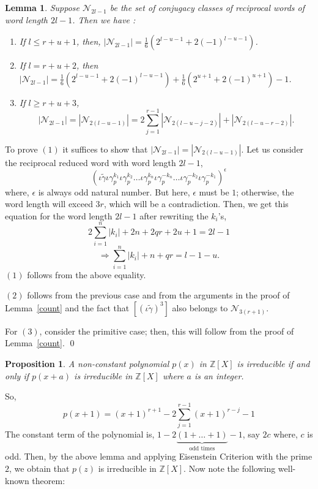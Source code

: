 \documentclass[11pt]{amsart}
\renewenvironment{proof}{{\bfseries Proof.}}{\qed}
\numberwithin{equation}{section}
\newtheorem{pro}[theorem]{Proposition}
\newtheorem{lemma}[theorem]{Lemma}
\theoremstyle{definition}
\newcommand{\gt}{\tilde{\gamma}}
\newcommand{\imp}{\Rightarrow}
\newcommand{\g}{\gamma_{p}}
\newcommand{\io}{\iota }
\newcommand{\lemref}[1]{Lemma~\ref{#1}}
\numberwithin{equation}{section}
\begin{document}
		\begin{lemma}
			Suppose $ \mathcal{N}_{2l-1}$ be the set of conjugacy classes of reciprocal words of word length $2l-1$. Then we have :
			
			\begin{enumerate}
				\item If $l\leq r+u+1$, then, $|\mathcal{N}_{2l-1}|=\frac{1}{6}(2^{l-u-1}+2(-1)^{l-u-1})$.
				\item If $l= r+u+2$, then $|\mathcal{N}_{2l-1}|=\frac{1}{6}(2^{l-u-1}+2(-1)^{l-u-1})+\frac{ 1}{6}(2^{u+1}+2(-1)^{u+1})-1$.
				\item If $l\geq r+u+3$, 
				\[|\mathcal{N}_{2l-1}|=|\mathcal{N}_{2(l-u-1)}|=2\sum_{j=1}^{r-1}|\mathcal{N}_{2(l-u-j-2)}|+|\mathcal{N}_{2(l-u-r-2)}|.\]
			\end{enumerate}
		\end{lemma}
		\begin{proof}
			To prove $ (1) $ it suffices to show that $|\mathcal{N}_{2l-1}|=|\mathcal{N}_{2(l-u-1)}|$. Let us consider the reciprocal reduced word with word length $2l-1$,  $$ (\io\gt\io  \g^{k_{1}}\io \g^{k_{2}}\dots \io \g^{k_{n}}\io \g^{-k_{n}}\dots\io \g^{-k_{2}}\io \g^{-k_{1}})^\epsilon $$ where, $ \epsilon $ is always odd natural number. But here, $\epsilon$ must be $ 1 $; otherwise, the word length will exceed $ 3r $, which will be a contradiction. Then, we get this equation for the word length $2l-1$ after rewriting the $k_{i}$'s,
			\[ 2\sum_{i=1}^{n}|k_{i}| +2n+2qr+2u+1= 2l-1\]
			\[\imp\sum_{i=1}^{n}|k_{i}| +n+qr= l-1-u. \]
			$ (1)$ follows from the above equality. 
			
			
			$ (2) $ follows from the previous case and from the arguments in the proof of \lemref{count} and the fact that $ [(\io\gt)^{3}] $ also belongs to $ \mathcal{N}_{3(r+1)}. $
			
			For $ (3) $, consider the primitive case; then, this will follow from the proof of \lemref{count}. \end{proof}
		
		\medskip 
		\begin{pro}
			A non-constant polynomial $p(x)$ in $\mathbb{Z}[X]$ is irreducible if and only if $p(x+a)$ is irreducible in $\mathbb{Z}[X]$ where $a$ is an integer. 
		\end{pro}
		So, $$p(x+1)=(x+1)^{r+1}-2\sum_{j=1}^{r-1}(x+1)^{r-j}-1$$
		The constant term of the polynomial is, $1-2\underbrace{(1+\dots+1)}_{\text{odd times}}-1$, say $2c$ where, $c$ is odd.
		Then, by the above lemma and applying Eisenstein Criterion with the prime $2$, we obtain that $p(z)$ is irreducible in $\mathbb{Z}[X]$. Now note the following well-known theorem: 
		
\end{document}

